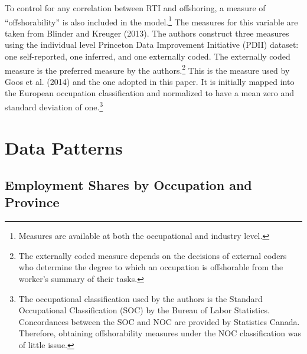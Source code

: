 \documentclass[undefended]{bumrp}
\begin{document}
To control for any correlation between RTI and offshoring, a measure of “offshorability” is also included in the model.\footnote{Measures are available at both the occupational and industry level.} The measures for this variable are taken from Blinder and Kreuger (2013). The authors construct three measures using the individual level Princeton Data Improvement Initiative (PDII) dataset: one self-reported, one inferred, and one externally coded. The externally coded measure is the preferred measure by the authors.\footnote{The externally coded measure depends on the decisions of external coders who determine the degree to which an occupation is offshorable from the worker’s summary of their tasks.}  This is the measure used by Goos et al. (2014) and the one adopted in this paper. It is initially mapped into the European occupation classification and normalized to have a mean zero and standard deviation of one.\footnote{The occupational classification used by the authors is the Standard Occupational Classification (SOC) by the Bureau of Labor Statistics. Concordances between the SOC and NOC are provided by Statistics Canada. Therefore, obtaining offshorability measures under the NOC classification was of little issue.}

\section{Data Patterns}

\subsection{Employment Shares by Occupation and Province}
\end{document}
